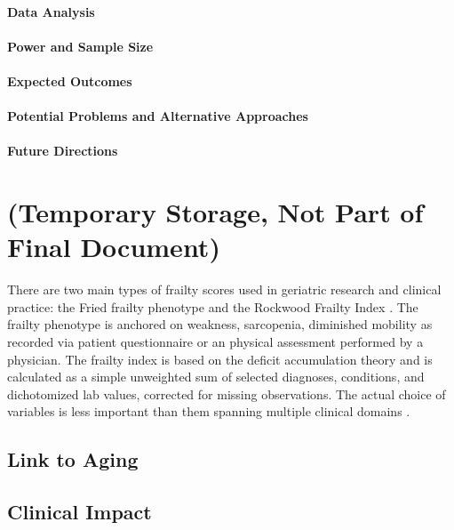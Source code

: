 \paragraph{Data Analysis}\label{data-analysis}

\paragraph{Power and Sample Size}\label{power-and-sample-size}

\paragraph{Expected Outcomes}\label{expected-outcomes}

\paragraph{Potential Problems and Alternative
      Approaches}\label{potential-problems-and-alternative-approaches}

\paragraph{Future Directions}\label{future-directions} 
    
\section{(Temporary Storage, Not Part of Final Document)}\label{ammo}
There are two main types of frailty scores used in geriatric research and clinical practice: the Fried frailty phenotype \cite{Fried_2001} and the Rockwood Frailty Index \cite{Mitnitski_2001}. The frailty phenotype is anchored on weakness, sarcopenia, diminished mobility as recorded via patient questionnaire or an physical assessment performed by a physician. The frailty index is based on the deficit accumulation theory and is calculated as a simple unweighted sum of selected diagnoses, conditions, and dichotomized lab values, corrected for missing observations. The actual choice of variables is less important than them spanning multiple clinical domains \cite{Searle_2008}. 

\subsection{Link to Aging}\label{link-to-aging}

\subsection{Clinical Impact}\label{clinical-impact}


